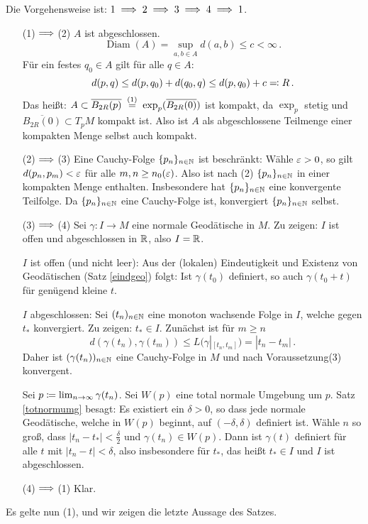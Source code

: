 \documentclass[a4paper,twoside,DIV15,BCOR12mm]{scrbook}
\begin{document}
\begin{beweis}
Die Vorgehensweise ist: $1 \implies 2 \implies 3 \implies 4 \implies 1$.
\begin{enumerate}[(1)$\folgt$(2)]
\item[(1)$\folgt$(2)] $A$ ist abgeschlossen. \[\operatorname{Diam}(A) = \sup_{a,b\in A}d(a,b) \le c < \infty\,.\]
Für ein festes $q_0\in A$ gilt für alle $q\in A$: \[d(p,q) \le d(p,q_0) + d(q_0,q) \le d(p,q_0) + c \ad R\,.\]
Das heißt: $A \subset \overline{B_{2R}(p)} \gleichwegen{(1)} \exp_p(\overline{B_{2R}(0)})$ ist kompakt, da $\exp_p$ stetig und $\overline{B_{2R}(0)}\subset T_pM$ kompakt ist. Also ist $A$ als abgeschlossene Teilmenge einer kompakten Menge selbst auch kompakt.
\item[(2)$\folgt$(3)] 
Eine Cauchy-Folge $\{p_n\}_{n\in \mathbb{N}}$ ist beschränkt: Wähle $\varepsilon>0$, so gilt $d(p_n,p_m) < \varepsilon$ für alle $m,n \ge n_0(\varepsilon)$. Also ist nach (2) $\{p_n\}_{n\in \mathbb{N}}$ in einer kompakten Menge enthalten. Insbesondere hat $\{p_n\}_{n\in \mathbb{N}}$ eine konvergente Teilfolge. Da $\{p_n\}_{n\in \mathbb{N}}$ eine Cauchy-Folge ist, konvergiert $\{p_n\}_{n\in\mathbb{N}}$ selbst.
\item[(3)$\folgt$(4)] 
Sei $\gamma: I\to M$ eine normale Geodätische in $M$. Zu zeigen: $I$ ist offen und abgeschlossen in $\mathbb{R}$, also $I=\mathbb{R}$.

$I$ ist offen (und nicht leer): Aus der (lokalen) Eindeutigkeit und Existenz von Geodätischen (Satz \ref{eindgeo}) folgt: Ist $\gamma(t_0)$ definiert, so auch $\gamma(t_0+t)$ für genügend kleine $t$.

$I$ abgeschlossen: Sei $(t_n)_{n\in \mathbb{N}}$ eine monoton wachsende Folge in $I$, welche gegen $t_*$ konvergiert. Zu zeigen: $t_* \in I$. Zunächst ist für $m\ge n$ \[d(\gamma(t_n),\gamma(t_m)) \le L(\gamma|_{[t_n,t_m]}) = |t_n - t_m|\,.\] Daher ist $(\gamma(t_n))_{n\in\mathbb{N}}$ eine Cauchy-Folge in $M$ und nach Voraussetzung(3) konvergent.

Sei $p\da \lim_{n\to\infty} \gamma(t_n)$. Sei $W(p)$ eine total normale Umgebung um $p$. Satz \ref{totnormumg} besagt: Es existiert ein $\delta > 0$, so dass jede normale Geodätische, welche in $W(p)$ beginnt, auf $(-\delta,\delta)$ definiert ist. Wähle $n$ so groß, dass $|t_n - t_*|<\frac\delta2$ und $\gamma(t_n) \in W(p)$. Dann ist $\gamma(t)$ definiert für alle $t$ mit $|t_n - t| < \delta$, also insbesondere für $t_*$, das heißt $t_*\in I$ und $I$ ist abgeschlossen.
\item[(4)$\folgt$(1)] 
Klar.
\end{enumerate}
Es gelte nun (1), und wir zeigen die letzte Aussage des Satzes.


\end{beweis}
\end{document}
